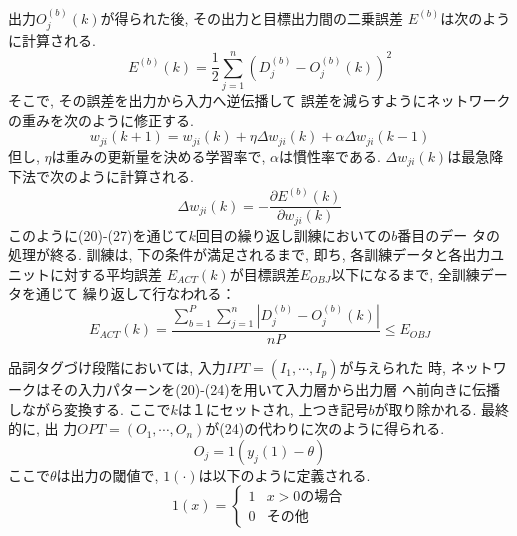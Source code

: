 出力$O^{(b)}_{j}(k)$が得られた後, その出力と目標出力間の二乗誤差
$E^{(b)}$は次のように計算される.
\begin{equation}
E^{(b)}(k)=\frac{1}{2} \sum_{j=1}^{n}(D^{(b)}_{j}-O^{(b)}_{j}(k))^2
\end{equation}
そこで, その誤差を出力から入力へ逆伝播して
誤差を減らすようにネットワークの重みを次のように修正する.
\begin{equation}
w_{ji}(k+1)=w_{ji}(k) + \eta \Delta w_{ji}(k) +\alpha \Delta
w_{ji}(k-1)
\end{equation}
但し, $\eta$は重みの更新量を決める学習率で, $\alpha$は慣性率である. 
$\Delta w_{ji}(k)$は最急降下法で次のように計算される.
\begin{equation}
\Delta w_{ji}(k)=-\frac{\partial E^{(b)}(k)}{\partial w_{ji}(k)}
\end{equation}
このように(20)-(27)を通じて$k$回目の繰り返し訓練においての$b$番目のデー
タの処理が終る.
訓練は, 下の条件が満足されるまで, 即ち,
各訓練データと各出力ユニットに対する平均誤差
$E_{ACT}(k)$が目標誤差$E_{OBJ}$以下になるまで, 全訓練データを通じて
繰り返して行なわれる：
\begin{equation}
E_{ACT}(k)=\frac{\sum_{b=1}^{P}\sum_{j=1}^{n}|D^{(b)}_{j}-O^{(b)}_{j}(k)|}{nP} 
\leq E_{OBJ}
\end{equation}

品詞タグづけ段階においては, 入力$IPT=(I_{1}, \cdots, I_{p})$が与えられた
時, ネットワークはその入力パターンを(20)-(24)を用いて入力層から出力層
へ前向きに伝播しながら変換する. 
ここで$k$は１にセットされ, 上つき記号$b$が取り除かれる. 最終的に, 出
力$OPT=(O_{1}, \cdots, O_{n})$が(24)の代わりに次のように得られる.
\begin{equation}
O_{j}=1(y_{j}(1)-\theta)
\end{equation}
ここで$\theta$は出力の閾値で, $1(\cdot)$は以下のように定義される.
\begin{equation}
1(x)=\left\{ \begin{array}{ll}
    1  &  \mbox{$x>0$の場合} \\
    0  &  \mbox{その他}
  \end{array}
\right.
\end{equation}

